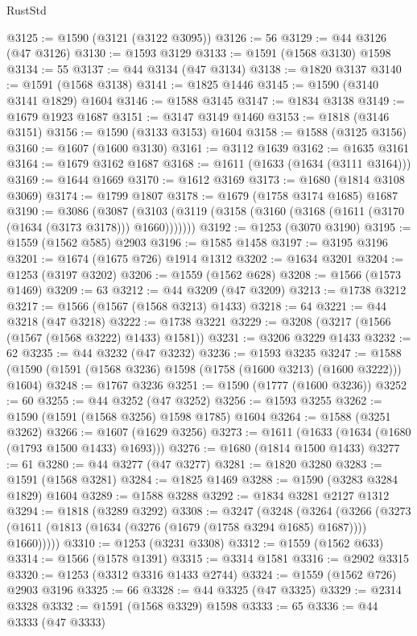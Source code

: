 \begin{lexlean}{RustStd}
\begin{coremodule}
@3125 := @1590 (@3121 (@3122 @3095))
@3126 := 56
@3129 := @44 @3126 (@47 @3126)
@3130 := @1593 @3129
@3133 := @1591 (@1568 @3130) @1598
@3134 := 55
@3137 := @44 @3134 (@47 @3134)
@3138 := @1820 @3137
@3140 := @1591 (@1568 @3138)
@3141 := @1825 @1446
@3145 := @1590 (@3140 @3141 @1829) @1604
@3146 := @1588 @3145
@3147 := @1834 @3138
@3149 := @1679 @1923 @1687
@3151 := @3147 @3149 @1460
@3153 := @1818 (@3146 @3151)
@3156 := @1590 (@3133 @3153) @1604
@3158 := @1588 (@3125 @3156)
@3160 := @1607 (@1600 @3130)
@3161 := @3112 @1639
@3162 := @1635 @3161
@3164 := @1679 @3162 @1687
@3168 := @1611 (@1633 (@1634 (@3111 @3164)))
@3169 := @1644 @1669
@3170 := @1612 @3169
@3173 := @1680 (@1814 @3108 @3069)
@3174 := @1799 @1807
@3178 := @1679 (@1758 @3174 @1685) @1687
@3190 := @3086
    (@3087 (@3103 (@3119 (@3158 (@3160 (@3168 (@1611 (@3170 (@1634 (@3173 @3178))) @1660)))))))
@3192 := @1253 (@3070 @3190)
@3195 := @1559 (@1562 @585) @2903
@3196 := @1585 @1458
@3197 := @3195 @3196
@3201 := @1674 (@1675 @726) @1914 @1312
@3202 := @1634 @3201
@3204 := @1253 (@3197 @3202)
@3206 := @1559 (@1562 @628)
@3208 := @1566 (@1573 @1469)
@3209 := 63
@3212 := @44 @3209 (@47 @3209)
@3213 := @1738 @3212
@3217 := @1566 (@1567 (@1568 @3213) @1433)
@3218 := 64
@3221 := @44 @3218 (@47 @3218)
@3222 := @1738 @3221
@3229 := @3208 (@3217 (@1566 (@1567 (@1568 @3222) @1433) @1581))
@3231 := @3206 @3229 @1433
@3232 := 62
@3235 := @44 @3232 (@47 @3232)
@3236 := @1593 @3235
@3247 := @1588 (@1590 (@1591 (@1568 @3236) @1598 (@1758 (@1600 @3213) (@1600 @3222))) @1604)
@3248 := @1767 @3236
@3251 := @1590 (@1777 (@1600 @3236))
@3252 := 60
@3255 := @44 @3252 (@47 @3252)
@3256 := @1593 @3255
@3262 := @1590 (@1591 (@1568 @3256) @1598 @1785) @1604
@3264 := @1588 (@3251 @3262)
@3266 := @1607 (@1629 @3256)
@3273 := @1611 (@1633 (@1634 (@1680 (@1793 @1500 @1433) @1693)))
@3276 := @1680 (@1814 @1500 @1433)
@3277 := 61
@3280 := @44 @3277 (@47 @3277)
@3281 := @1820 @3280
@3283 := @1591 (@1568 @3281)
@3284 := @1825 @1469
@3288 := @1590 (@3283 @3284 @1829) @1604
@3289 := @1588 @3288
@3292 := @1834 @3281 @2127 @1312
@3294 := @1818 (@3289 @3292)
@3308 := @3247
    (@3248
      (@3264
        (@3266 (@3273 (@1611 (@1813 (@1634 (@3276 (@1679 (@1758 @3294 @1685) @1687)))) @1660)))))
@3310 := @1253 (@3231 @3308)
@3312 := @1559 (@1562 @633)
@3314 := @1566 (@1578 @1391)
@3315 := @3314 @1581
@3316 := @2902 @3315
@3320 := @1253 (@3312 @3316 @1433 @2744)
@3324 := @1559 (@1562 @726) @2903 @3196
@3325 := 66
@3328 := @44 @3325 (@47 @3325)
@3329 := @2314 @3328
@3332 := @1591 (@1568 @3329) @1598
@3333 := 65
@3336 := @44 @3333 (@47 @3333)

\end{coremodule}
\end{lexlean}

